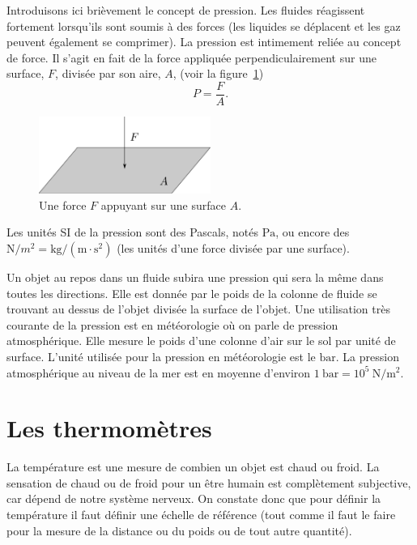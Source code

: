 \documentclass[a4paper,12pt]{book}
\newcommand{\m}{\mathrm{m}}
\newcommand{\s}{\mathrm{s}}
\newcommand{\kg}{\mathrm{kg}}
\newcommand{\N}{\mathrm{N}}
\renewcommand{\bar}{\mathrm{bar}}
\newcommand{\Pa}{\mathrm{Pa}}
\begin{document}
Introduisons ici brièvement le concept de pression. Les fluides
réagissent fortement lorsqu'ils sont soumis à des forces (les liquides se déplacent et les gaz peuvent également se comprimer). 
La pression est intimement reliée au concept de force. Il s'agit en fait de la force appliquée perpendiculairement sur une surface, $F$, divisée
par son aire, $A$, (voir la figure~\ref{fig_FA})
\begin{equation}
P=\frac{F}{A}.
\end{equation}
\begin{figure}
\begin{center}
\includegraphics[width=0.5\textwidth]{figs/pression.pdf}
\caption{Une force $F$ appuyant sur une surface $A$.}
\label{fig_FA}
\end{center}
\end{figure} 
Les unités SI de la pression sont des Pascals, 
notés $\Pa$, ou encore des $\N/m^2=\kg/(\m\cdot\s^2)$ (les unités d'une force divisée par une surface).

Un objet au repos dans un fluide subira une pression qui sera la même dans toutes les directions.
Elle est donnée par le poids de la colonne de fluide se trouvant au  dessus de l'objet divisée la surface de l'objet.
Une utilisation très courante de la pression est en météorologie où 
on parle de pression atmosphérique. Elle mesure le poids d'une colonne d'air 
sur le sol par unité de surface. L'unité utilisée pour la pression en météorologie est le $\bar$.
La pression atmosphérique au niveau de la mer est en moyenne d'environ $1\ \bar=10^5\ \N/\m^2$.




\section{Les thermomètres}

La température est une mesure de combien un objet est chaud ou froid. La sensation de chaud ou de froid pour un être humain
est complètement subjective, car dépend de notre système nerveux. On constate donc que pour définir la température il faut définir une 
échelle de référence (tout comme il faut le faire pour la mesure de la distance ou du poids ou de tout autre quantité).
\end{document}

